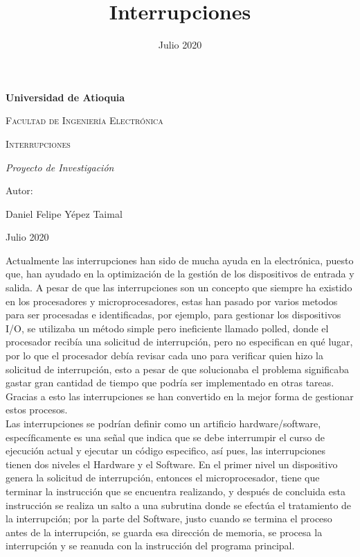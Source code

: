 \documentclass{article}
\title{Interrupciones}
\date{Julio 2020}
\begin{document}
\begin{titlepage}
\centering
{\bfseries\LARGE Universidad de Atioquia\par}
\vspace{1cm}
{\scshape\Large Facultad de Ingenier\'ia Electr\'onica \par}
\vspace{3cm}
{\scshape\Huge Interrupciones \par}
\vspace{3cm}
{\itshape\Large Proyecto de Investigaci\'on \par}
\vfill
{\Large Autor: \par}
{\Large Daniel Felipe Y\'epez Taimal \par}
\vfill
{\Large Julio 2020 \par}
\end{titlepage}

\maketitle

Actualmente las interrupciones han sido de mucha ayuda en la electrónica, puesto que, han ayudado en la optimización de la gestión de los dispositivos de entrada y salida. A pesar de que las interrupciones son un concepto que siempre ha existido en los procesadores y microprocesadores, estas han pasado por varios metodos para ser procesadas e identificadas, por ejemplo, para gestionar los dispositivos I/O, se utilizaba un método simple pero ineficiente llamado polled, donde el procesador recibía una solicitud de interrupción, pero no especifican en qué lugar, por lo que el procesador debía revisar cada uno para verificar quien hizo la solicitud de interrupción, esto a pesar de que solucionaba el problema significaba gastar gran cantidad de tiempo que podría ser implementado en otras tareas. Gracias a esto las interrupciones se han convertido en la mejor forma de gestionar estos procesos.\\

Las interrupciones se podrían definir como un artificio hardware/software, específicamente es una señal que indica que se debe interrumpir el curso de ejecución actual y ejecutar un código especifico, así pues, las interrupciones tienen dos niveles el Hardware y el Software. En el primer nivel un dispositivo genera la solicitud de interrupción, entonces el microprocesador, tiene que terminar la instrucción que se encuentra realizando, y después de concluida esta instrucción se realiza un salto a una subrutina donde se efectúa el tratamiento de la interrupción; por la parte del Software, justo cuando se termina el proceso antes de la interrupción, se guarda esa dirección de memoria, se procesa la interrupción y se reanuda con la instrucción del programa principal.\\
\end{document}
